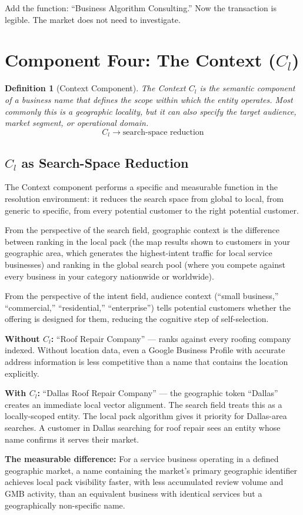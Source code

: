 \documentclass[12pt, openany]{book}
\theoremstyle{thmstyle}
\theoremstyle{defstyle}
\newtheorem{definition}{Definition}[chapter]
\newcommand{\Cl}{C_l}
\begin{document}
Add the function: ``Business Algorithm Consulting.'' Now the transaction is legible. The market does not need to investigate.

\section{Component Four: The Context ($C_l$)}

\begin{definition}[Context Component]
The Context $\Cl$ is the semantic component of a business name that defines the scope within which the entity operates. Most commonly this is a geographic locality, but it can also specify the target audience, market segment, or operational domain.
\[
\Cl \rightarrow \text{search-space reduction}
\]
\end{definition}

\subsection{$C_l$ as Search-Space Reduction}

The Context component performs a specific and measurable function in the resolution environment: it reduces the search space from global to local, from generic to specific, from every potential customer to the right potential customer.

From the perspective of the search field, geographic context is the difference between ranking in the local pack (the map results shown to customers in your geographic area, which generates the highest-intent traffic for local service businesses) and ranking in the global search pool (where you compete against every business in your category nationwide or worldwide).

From the perspective of the intent field, audience context (``small business,'' ``commercial,'' ``residential,'' ``enterprise'') tells potential customers whether the offering is designed for them, reducing the cognitive step of self-selection.

\begin{examplebox}
\textbf{Without $\Cl$:}
``Roof Repair Company'' --- ranks against every roofing company indexed. Without location data, even a Google Business Profile with accurate address information is less competitive than a name that contains the location explicitly.

\textbf{With $\Cl$:}
``Dallas Roof Repair Company'' --- the geographic token ``Dallas'' creates an immediate local vector alignment. The search field treats this as a locally-scoped entity. The local pack algorithm gives it priority for Dallas-area searches. A customer in Dallas searching for roof repair sees an entity whose name confirms it serves their market.

\textbf{The measurable difference:}
For a service business operating in a defined geographic market, a name containing the market's primary geographic identifier achieves local pack visibility faster, with less accumulated review volume and GMB activity, than an equivalent business with identical services but a geographically non-specific name.
\end{examplebox}
\end{document}
